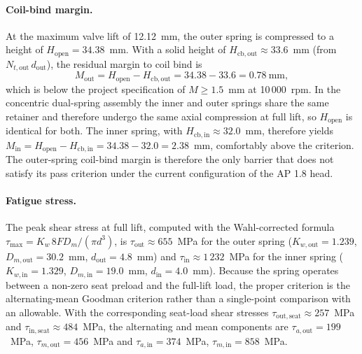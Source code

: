 \paragraph{Coil-bind margin.}
At the maximum valve lift of 12.12~mm, the outer spring is compressed
to a height of $H_{\mathrm{open}}=34.38$~mm. With a solid height of
$H_{\mathrm{cb,out}}\approx 33.6$~mm (from $N_{t,\mathrm{out}}\,d_{\mathrm{out}}$),
the residual margin to coil bind is
\begin{equation}
M_{\mathrm{out}}=H_{\mathrm{open}}-H_{\mathrm{cb,out}}=34.38-33.6=0.78~\mathrm{mm},
\label{eq:Mout}
\end{equation}
which is below the project specification of $M\geq 1.5$~mm at
10\,000~rpm. In the concentric dual-spring assembly the inner and
outer springs share the same retainer and therefore undergo the same
axial compression at full lift, so $H_{\mathrm{open}}$ is identical
for both. The inner spring, with $H_{\mathrm{cb,in}}\approx 32.0$~mm,
therefore yields $M_{\mathrm{in}}=H_{\mathrm{open}}-H_{\mathrm{cb,in}}=34.38-32.0=2.38$~mm,
comfortably above the criterion. The
outer-spring coil-bind margin is therefore the only barrier that does
not satisfy its pass criterion under the current configuration of the
AP 1.8 head.

\paragraph{Fatigue stress.}
The peak shear stress at full lift, computed with the Wahl-corrected
formula $\tau_{\max}=K_{w}\,8FD_{m}/(\pi d^{3})$, is
$\tau_{\mathrm{out}}\approx 655$~MPa for the outer spring
($K_{w,\mathrm{out}}=1.239$, $D_{m,\mathrm{out}}=30.2$~mm,
$d_{\mathrm{out}}=4.8$~mm) and $\tau_{\mathrm{in}}\approx 1\,232$~MPa
for the inner spring ($K_{w,\mathrm{in}}=1.329$,
$D_{m,\mathrm{in}}=19.0$~mm, $d_{\mathrm{in}}=4.0$~mm). Because the
spring operates between a non-zero seat preload and the full-lift
load, the proper criterion is the alternating-mean Goodman criterion
\citep[\S~10-7]{shigley2020} rather than a single-point comparison
with an allowable. With the corresponding seat-load shear stresses
$\tau_{\mathrm{out},\mathrm{seat}}\approx 257$~MPa and
$\tau_{\mathrm{in},\mathrm{seat}}\approx 484$~MPa, the alternating
and mean components are
$\tau_{a,\mathrm{out}}=199$~MPa, $\tau_{m,\mathrm{out}}=456$~MPa
and $\tau_{a,\mathrm{in}}=374$~MPa, $\tau_{m,\mathrm{in}}=858$~MPa.

